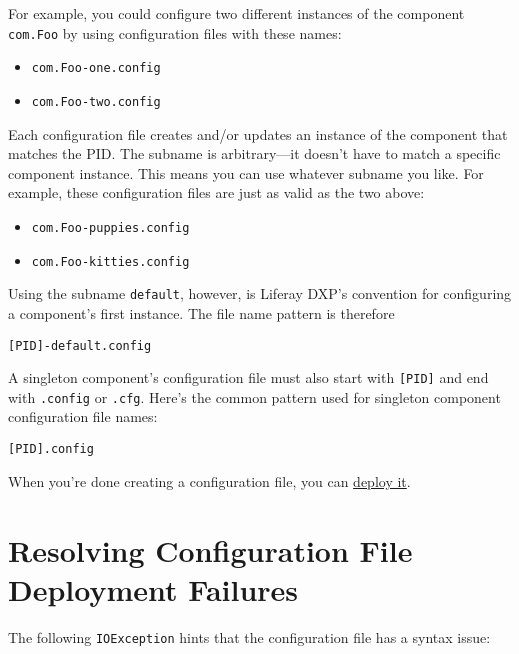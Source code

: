 For example, you could configure two different instances of the
component \texttt{com.Foo} by using configuration files with these
names:

\begin{itemize}
\tightlist
\item
  \texttt{com.Foo-one.config}
\item
  \texttt{com.Foo-two.config}
\end{itemize}

Each configuration file creates and/or updates an instance of the
component that matches the PID. The subname is arbitrary---it doesn't
have to match a specific component instance. This means you can use
whatever subname you like. For example, these configuration files are
just as valid as the two above:

\begin{itemize}
\tightlist
\item
  \texttt{com.Foo-puppies.config}
\item
  \texttt{com.Foo-kitties.config}
\end{itemize}

Using the subname \texttt{default}, however, is Liferay DXP's convention
for configuring a component's first instance. The file name pattern is
therefore

\begin{verbatim}
[PID]-default.config
\end{verbatim}

A singleton component's configuration file must also start with
\texttt{{[}PID{]}} and end with \texttt{.config} or \texttt{.cfg}.
Here's the common pattern used for singleton component configuration
file names:

\begin{verbatim}
[PID].config
\end{verbatim}

When you're done creating a configuration file, you can
\href{/docs/7-1/user/-/knowledge_base/u/understanding-system-configuration-files\#deploying-a-configuration-file}{deploy
it}.

\section{Resolving Configuration File Deployment
Failures}\label{resolving-configuration-file-deployment-failures}

The following \texttt{IOException} hints that the configuration file has
a syntax issue:


